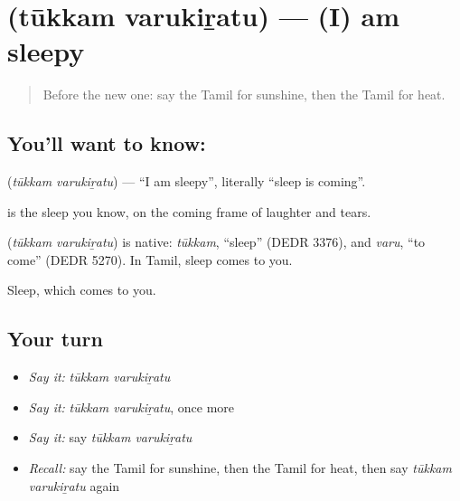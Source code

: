 \section[\texorpdfstring{\ta{தூக்கம்} \ta{வருகிறது} (tūkkam varukiṟatu)}{தூக்கம் வருகிறது (tūkkam varukiṟatu)}]{  (tūkkam varukiṟatu) — (I) am sleepy}

\label{lesson:TA-C91-sleepy}



\begin{quote}
Before the new one: say the Tamil for sunshine, then the Tamil for heat.
\end{quote}

\subsection*{You'll want to know:  }
\textbf{ } (\emph{tūkkam varukiṟatu}) — \textquotedblleft{}I am sleepy\textquotedblright{}, literally \textquotedblleft{}sleep is coming\textquotedblright{}.

\textbf{} is the sleep you know, on the coming frame of laughter and tears.

\begin{cousinweb}
\textbf{ } (\emph{tūkkam varukiṟatu}) is native: \emph{tūkkam}, \textquotedblleft{}sleep\textquotedblright{} (DEDR 3376), and \emph{varu}, \textquotedblleft{}to come\textquotedblright{} (DEDR 5270). In Tamil, sleep comes to you.
\end{cousinweb}

\begin{grammarlens}[title={What you've built}]
Sleep, which comes to you.
\end{grammarlens}

\subsection*{Your turn}
\begin{itemize}
\raggedright
  \item \emph{Say it:} \emph{tūkkam varukiṟatu}
  \item \emph{Say it:} \emph{tūkkam varukiṟatu}, once more
  \item \emph{Say it:} say \emph{tūkkam varukiṟatu}
  \item \emph{Recall:} say the Tamil for sunshine, then the Tamil for heat, then say \emph{tūkkam varukiṟatu} again
\end{itemize}

